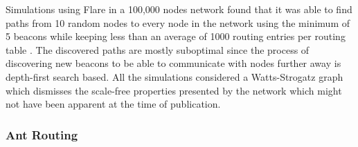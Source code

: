 Simulations using Flare in a 100,000 nodes network found that it was able to find paths from 10 random nodes to every node in the network using the minimum of 5 beacons while keeping less than an average of 1000 routing entries per routing table \cite{flare}. The discovered paths are mostly suboptimal since the process of discovering new beacons to be able to communicate with nodes further away is depth-first search based. All the simulations considered a Watts-Strogatz graph \cite{watts-strogatz} which dismisses the scale-free properties presented by the network which might not have been apparent at the time of publication.\\

\subsubsection{Ant Routing}


